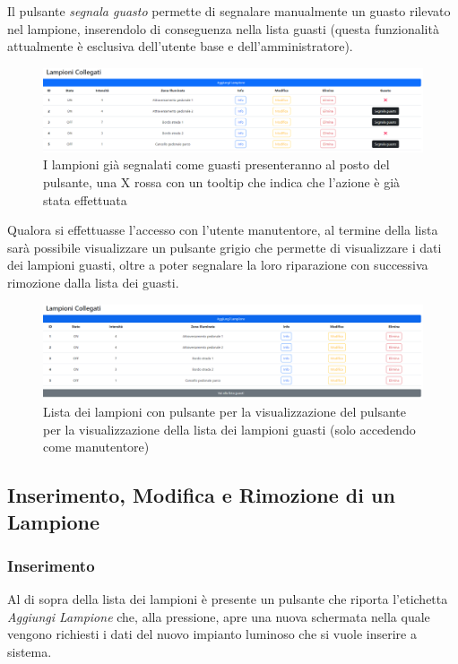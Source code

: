 \documentclass[a4paper, 12pt]{article}
\begin{document}
Il pulsante \textit{segnala guasto} permette di segnalare manualmente un guasto rilevato nel lampione, inserendolo di conseguenza nella lista guasti (questa funzionalità attualmente è esclusiva dell'utente base e dell'amministratore).\\
\begin{figure}[H]
\centering
\includegraphics[width=\textwidth]{ListaLampioniConGuasti}
\caption{I lampioni già segnalati come guasti presenteranno al posto del pulsante, una X rossa con un tooltip che indica che l'azione è già stata effettuata}
\end{figure}
Qualora si effettuasse l'accesso con l'utente manutentore, al termine della lista sarà possibile visualizzare un pulsante grigio che permette di visualizzare i dati dei lampioni guasti, oltre a poter segnalare la loro riparazione con successiva rimozione dalla lista dei guasti.
\begin{figure}[H]
\centering
\includegraphics[width=\textwidth]{ListaLampioniVistaManutentore}
\caption{Lista dei lampioni con pulsante per la visualizzazione del pulsante per la visualizzazione della lista dei lampioni guasti (solo accedendo come manutentore)}
\end{figure}

\subsection{Inserimento, Modifica e Rimozione di un Lampione}
\subsubsection{Inserimento}
Al di sopra della lista dei lampioni è presente un pulsante che riporta l'etichetta \textit{Aggiungi Lampione} che, alla pressione, apre una nuova schermata nella quale vengono richiesti i dati del nuovo impianto luminoso che si vuole inserire a sistema.
\end{document}
